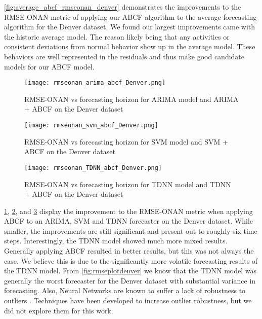\ref{fig:average_abcf_rmseonan_denver} demonstrates the improvements to the RMSE-ONAN metric of applying our ABCF algorithm to the average forecasting algorithm for the Denver dataset.  We found our largest improvements came with the historic average model.  The reason likely being that any activities or consistent deviations from normal behavior show up in the average model.  These behaviors are well represented in the residuals and thus make good candidate models for our ABCF model.

\begin{figure}[!h]
	\begin{center}
		\texttt{[image: rmseonan\_arima\_abcf\_Denver.png]}
	\end{center}
	\caption{RMSE-ONAN vs forecasting horizon for ARIMA model and ARIMA + ABCF on the Denver dataset}
	\label{fig:arima_abcf_rmseonan_denver}
\end{figure}

\begin{figure}[!h]
	\begin{center}
		\texttt{[image: rmseonan\_svm\_abcf\_Denver.png]}
	\end{center}
	\caption{RMSE-ONAN vs forecasting horizon for SVM model and SVM + ABCF on the Denver dataset}
	\label{fig:svm_abcf_rmseonan_denver}
\end{figure}

\begin{figure}[!h]
	\begin{center}
		\texttt{[image: rmseonan\_TDNN\_abcf\_Denver.png]}
	\end{center}
	\caption{RMSE-ONAN vs forecasting horizon for TDNN model and TDNN + ABCF on the Denver dataset}
	\label{fig:tdnn_abcf_rmseonan_denver}
\end{figure}

\ref{fig:arima_abcf_rmseonan_denver}, \ref{fig:svm_abcf_rmseonan_denver}, and \ref{fig:tdnn_abcf_rmseonan_denver} display the improvement to the RMSE-ONAN metric when applying ABCF to an ARIMA, SVM and TDNN forecaster on the Denver dataset.  While smaller, the improvements are still significant and present out to roughly six time steps.  Interestingly, the TDNN model showed much more mixed results.  Generally applying ABCF resulted in better results, but this was not always the case.  We believe this is due to the significantly more volatile forecasting results of the TDNN model.  From \ref{fig:rmseplotdenver} we know that the TDNN model was generally the worst forecaster for the Denver dataset with substantial variance in forecasting.  Also, Neural Networks are known to suffer a lack of robustness to outliers \cite{connor1994}.  Techniques have been developed to increase outlier robustness, but we did not explore them for this work.

